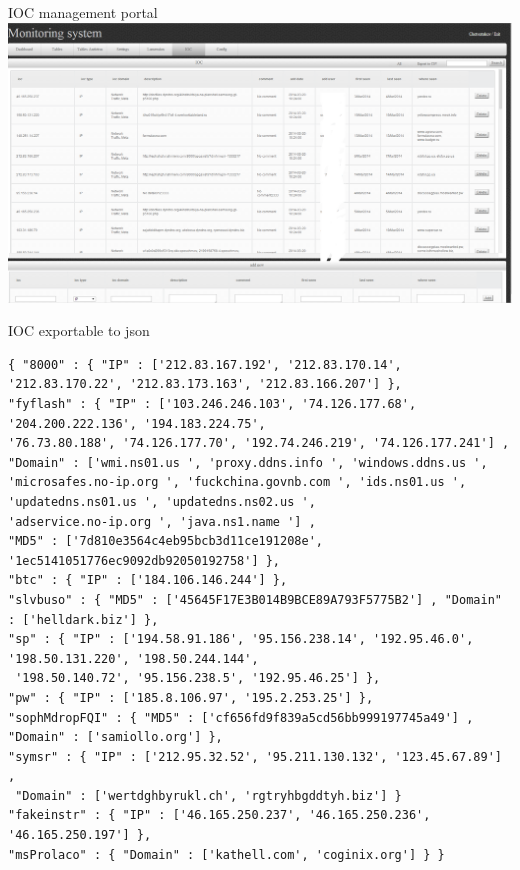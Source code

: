 \documentclass[presentation,smaller]{beamer}
\begin{document}
\begin{frame}[label=sec-7-9]{IOC management portal}
\includegraphics[width=14cm]{images/ioc01.png}
\end{frame}

\begin{frame}[fragile,label=sec-7-10]{IOC exportable to json}
 \tiny
\lstset{language=C,numbers=none}
\begin{lstlisting}
{ "8000" : { "IP" : ['212.83.167.192', '212.83.170.14', '212.83.170.22', '212.83.173.163', '212.83.166.207'] },
"fyflash" : { "IP" : ['103.246.246.103', '74.126.177.68', '204.200.222.136', '194.183.224.75', 
'76.73.80.188', '74.126.177.70', '192.74.246.219', '74.126.177.241'] , 
"Domain" : ['wmi.ns01.us ', 'proxy.ddns.info ', 'windows.ddns.us ', 
'microsafes.no-ip.org ', 'fuckchina.govnb.com ', 'ids.ns01.us ', 
'updatedns.ns01.us ', 'updatedns.ns02.us ', 
'adservice.no-ip.org ', 'java.ns1.name '] , 
"MD5" : ['7d810e3564c4eb95bcb3d11ce191208e', '1ec5141051776ec9092db92050192758'] },
"btc" : { "IP" : ['184.106.146.244'] },
"slvbuso" : { "MD5" : ['45645F17E3B014B9BCE89A793F5775B2'] , "Domain" : ['helldark.biz'] },
"sp" : { "IP" : ['194.58.91.186', '95.156.238.14', '192.95.46.0', '198.50.131.220', '198.50.244.144',
 '198.50.140.72', '95.156.238.5', '192.95.46.25'] },
"pw" : { "IP" : ['185.8.106.97', '195.2.253.25'] },
"sophMdropFQI" : { "MD5" : ['cf656fd9f839a5cd56bb999197745a49'] , "Domain" : ['samiollo.org'] },
"symsr" : { "IP" : ['212.95.32.52', '95.211.130.132', '123.45.67.89'] ,
 "Domain" : ['wertdghbyrukl.ch', 'rgtryhbgddtyh.biz'] } 
"fakeinstr" : { "IP" : ['46.165.250.237', '46.165.250.236', '46.165.250.197'] },
"msProlaco" : { "Domain" : ['kathell.com', 'coginix.org'] } }
\end{lstlisting}
\normalsize
\end{frame}
\end{document}
